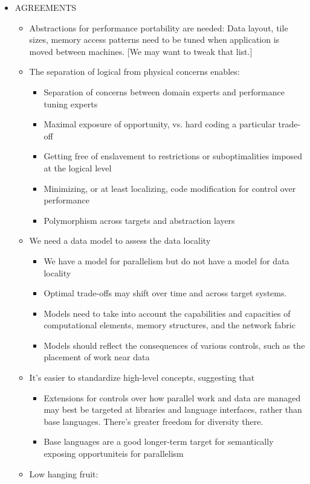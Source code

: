 \begin{itemize}
\item AGREEMENTS
  \begin{itemize}
  \item Abstractions for performance portability are needed: Data layout, tile sizes, memory access patterns need to be tuned when application is moved between machines. [We may want to tweak that list.]
  \item The separation of logical from physical concerns enables:
  \begin{itemize}
  \item Separation of concerns between domain experts and performance tuning experts
  \item Maximal exposure of opportunity, vs. hard coding a particular trade-off
  \item Getting free of enslavement to restrictions or suboptimalities imposed at the logical level
  \item Minimizing, or at least localizing, code modification for control over performance
  \item Polymorphism across targets and abstraction layers
  \end{itemize}
  \item We need a data model to assess the data locality
  \begin{itemize}
  \item We have a model for parallelism but do not have a model for data locality
  \item Optimal trade-offs may shift over time and across target systems.  
  \item Models need to take into account the capabilities and capacities of computational elements, memory structures, and the network fabric 
  \item Models should reflect the consequences of various controls, such as the placement of work near data
  \end{itemize}
  \item It's easier to standardize high-level concepts, suggesting that
  \begin{itemize}
  \item Extensions for controls over how parallel work and data are managed may best be targeted at libraries and language interfaces, rather than base languages.  There's greater freedom for diversity there.
  \item Base languages are a good longer-term target for semantically exposing opportuniteis for parallelism
  \end{itemize}
  \item Low hanging fruit: 

\end{itemize}
\end{itemize}
